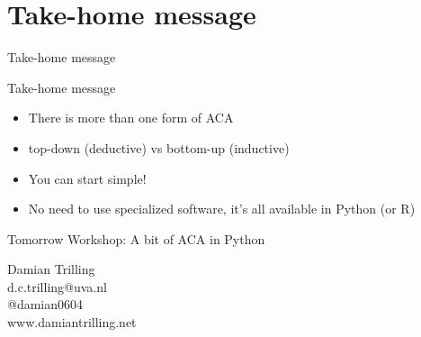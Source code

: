 \documentclass{beamer}
\begin{document}
\section{Take-home message}
\begin{frame}
	Take-home message
\end{frame}

\begin{frame}{Take-home message}
\begin{itemize}
	\item There is more than one form of ACA
	\item top-down (deductive) vs bottom-up (inductive)
	\item You can start simple!
	\item No need to use specialized software, it's all available in Python (or R)
\end{itemize}
\end{frame}


\begin{frame}{Tomorrow}
	Workshop: A bit of ACA in Python
\end{frame}

\begin{frame}[plain]
	\huge
	\centering
	Damian Trilling\\ \vspace{0.5cm}
	d.c.trilling@uva.nl\\
	@damian0604\\
	www.damiantrilling.net\\
\end{frame}
\end{document}
